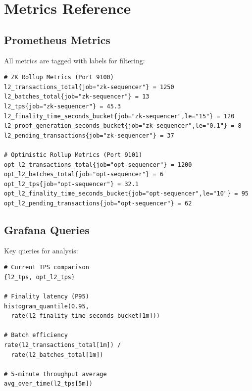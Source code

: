 \chapter{Metrics Reference}
\label{app:metrics}

\section{Prometheus Metrics}

All metrics are tagged with labels for filtering:

\begin{listing}[H]
    \begin{verbatim}
# ZK Rollup Metrics (Port 9100)
l2_transactions_total{job="zk-sequencer"} = 1250
l2_batches_total{job="zk-sequencer"} = 13
l2_tps{job="zk-sequencer"} = 45.3
l2_finality_time_seconds_bucket{job="zk-sequencer",le="15"} = 120
l2_proof_generation_seconds_bucket{job="zk-sequencer",le="0.1"} = 8
l2_pending_transactions{job="zk-sequencer"} = 37

# Optimistic Rollup Metrics (Port 9101)
opt_l2_transactions_total{job="opt-sequencer"} = 1200
opt_l2_batches_total{job="opt-sequencer"} = 6
opt_l2_tps{job="opt-sequencer"} = 32.1
opt_l2_finality_time_seconds_bucket{job="opt-sequencer",le="10"} = 95
opt_l2_pending_transactions{job="opt-sequencer"} = 62
    \end{verbatim}
    \caption{Example Prometheus output}
    \label{lst:prometheus-output}
\end{listing}

\section{Grafana Queries}

Key queries for analysis:

\begin{listing}[H]
    \begin{verbatim}
# Current TPS comparison
{l2_tps, opt_l2_tps}

# Finality latency (P95)
histogram_quantile(0.95, 
  rate(l2_finality_time_seconds_bucket[1m]))

# Batch efficiency
rate(l2_transactions_total[1m]) / 
  rate(l2_batches_total[1m])

# 5-minute throughput average
avg_over_time(l2_tps[5m])
    \end{verbatim}
    \caption{Grafana PromQL examples}
    \label{lst:grafana-queries}
\end{listing}
